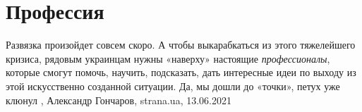  
 
 
 
 
\chapter{Профессия}

Развязка произойдет совсем скоро. А чтобы выкарабкаться из этого тяжелейшего
кризиса, рядовым украинцам нужны «наверху» настоящие \emph{профессионалы}, которые
смогут помочь, научить, подсказать, дать интересные идеи по выходу из этой
искусственно созданной ситуации. Да, мы дошли до «точки», петух уже клюнул
, 
Александр Гончаров, strana.ua, 13.06.2021

